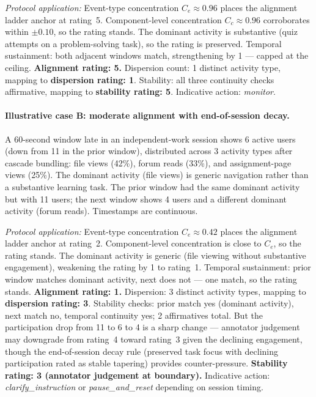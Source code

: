 \documentclass[preprint,12pt,authoryear]{elsarticle}
\begin{document}
\textit{Protocol application:} Event-type concentration $C_e \approx 0.96$ places the alignment ladder anchor at rating~5. Component-level concentration $C_c \approx 0.96$ corroborates within $\pm 0.10$, so the rating stands. The dominant activity is substantive (quiz attempts on a problem-solving task), so the rating is preserved. Temporal sustainment: both adjacent windows match, strengthening by 1 --- capped at the ceiling. \textbf{Alignment rating: 5.} Dispersion count: 1 distinct activity type, mapping to \textbf{dispersion rating: 1}. Stability: all three continuity checks affirmative, mapping to \textbf{stability rating: 5}. Indicative action: \textit{monitor}.

\paragraph{Illustrative case B: moderate alignment with end-of-session decay.}
A 60-second window late in an independent-work session shows 6 active users (down from 11 in the prior window), distributed across 3 activity types after cascade bundling: file views (42\%), forum reads (33\%), and assignment-page views (25\%). The dominant activity (file views) is generic navigation rather than a substantive learning task. The prior window had the same dominant activity but with 11 users; the next window shows 4 users and a different dominant activity (forum reads). Timestamps are continuous.

\textit{Protocol application:} Event-type concentration $C_e \approx 0.42$ places the alignment ladder anchor at rating~2. Component-level concentration is close to $C_e$, so the rating stands. The dominant activity is generic (file viewing without substantive engagement), weakening the rating by 1 to rating~1. Temporal sustainment: prior window matches dominant activity, next does not --- one match, so the rating stands. \textbf{Alignment rating: 1.} Dispersion: 3 distinct activity types, mapping to \textbf{dispersion rating: 3}. Stability checks: prior match yes (dominant activity), next match no, temporal continuity yes; 2 affirmatives total. But the participation drop from 11 to 6 to 4 is a sharp change --- annotator judgement may downgrade from rating~4 toward rating~3 given the declining engagement, though the end-of-session decay rule (preserved task focus with declining participation rated as stable tapering) provides counter-pressure. \textbf{Stability rating: 3 (annotator judgement at boundary).} Indicative action: \textit{clarify\_instruction} or \textit{pause\_and\_reset} depending on session timing.
\end{document}
